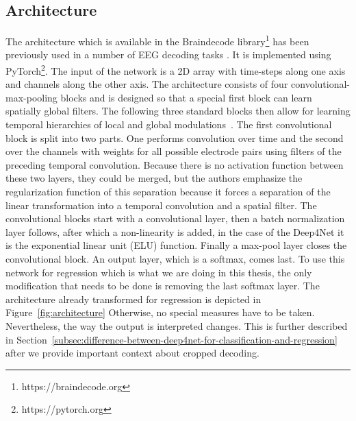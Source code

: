 \subsection{Architecture}\label{subsec:architecture}
The architecture which is available in the Braindecode library\footnote{https://braindecode.org} has been previously used in a number of EEG decoding tasks \cite{Hammer-2021, schirrmeister-deep-2017, hartmann-hierarchical-2018}.
It is implemented using PyTorch\footnote{https://pytorch.org}.
The input of the network is a 2D array with time-steps along one axis and channels along the other axis.
The architecture consists of four convolutional-max-pooling blocks and is designed so that a special first block can learn spatially global filters.
The following three standard blocks then allow for learning temporal hierarchies of local and global modulations~\cite{schirrmeister-deep-2017}.
The first convolutional block is split into two parts.
One performs convolution over time and the second over the channels with weights for all possible electrode pairs using filters of the preceding temporal convolution.
Because there is no activation function between these two layers, they could be merged, but the authors emphasize the regularization function of this separation because it forces a separation of the linear transformation into a temporal convolution and a spatial filter.
The convolutional blocks start with a convolutional layer, then a batch normalization layer follows, after which a non-linearity is added, in the case of the Deep4Net it is the exponential linear unit (ELU) function\cite{clevert-elu-2016}.
Finally a max-pool layer closes the convolutional block.
An output layer, which is a softmax, comes last.
To use this network for regression which is what we are doing in this thesis, the only modification that needs to be done is removing the last softmax layer.
The architecture already transformed for regression is depicted in Figure~\ref{fig:architecture}
Otherwise, no special measures have to be taken.
Nevertheless, the way the output is interpreted changes.
This is further described in Section~\ref{subsec:difference-between-deep4net-for-classification-and-regression} after we provide important context about cropped decoding.


